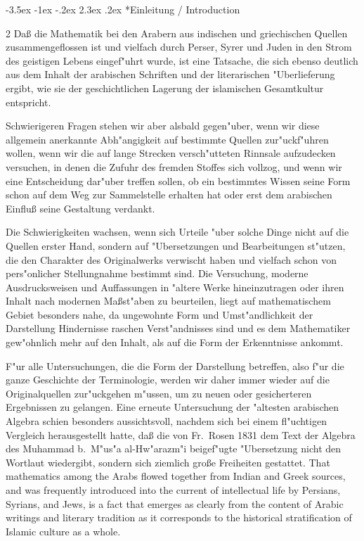 \documentclass[10pt,a4paper]{article}
\makeatletter
\renewcommand{\switchcolumn}{\syncronize\nointerlineskip\columnbreak}
\renewcommand{\section}{\@startsection{section}{1}{\z@}%
  {-3.5ex \@plus -1ex \@minus -.2ex}%
  {2.3ex \@plus .2ex}%
  {\normalfont\Large\bfseries\color{sectioncolor}}}
\makeatother
\begin{document}
\section*{Einleitung / Introduction}

\begin{paracol}{2}
Da\ss{} die Mathematik bei den Arabern aus indischen und griechischen Quellen zusammengeflossen ist und vielfach durch Perser, Syrer und Juden in den Strom des geistigen Lebens eingef"uhrt wurde, ist eine Tatsache, die sich ebenso deutlich aus dem Inhalt der arabischen Schriften und der literarischen "Uberlieferung ergibt, wie sie der geschichtlichen Lagerung der islamischen Gesamtkultur entspricht.

Schwierigeren Fragen stehen wir aber alsbald gegen"uber, wenn wir diese allgemein anerkannte Abh"angigkeit auf bestimmte Quellen zur"uckf"uhren wollen, wenn wir die auf lange Strecken versch"utteten Rinnsale aufzudecken versuchen, in denen die Zufuhr des fremden Stoffes sich vollzog, und wenn wir eine Entscheidung dar"uber treffen sollen, ob ein bestimmtes Wissen seine Form schon auf dem Weg zur Sammelstelle erhalten hat oder erst dem arabischen Einflu\ss{} seine Gestaltung verdankt.

Die Schwierigkeiten wachsen, wenn sich Urteile "uber solche Dinge nicht auf die Quellen erster Hand, sondern auf "Ubersetzungen und Bearbeitungen st"utzen, die den Charakter des Originalwerks verwischt haben und vielfach schon von pers"onlicher Stellungnahme bestimmt sind. Die Versuchung, moderne Ausdrucksweisen und Auffassungen in "altere Werke hineinzutragen oder ihren Inhalt nach modernen Ma\ss{}st"aben zu beurteilen, liegt auf mathematischem Gebiet besonders nahe, da ungewohnte Form und Umst"andlichkeit der Darstellung Hindernisse raschen Verst"andnisses sind und es dem Mathematiker gew"ohnlich mehr auf den Inhalt, als auf die Form der Erkenntnisse ankommt.

F"ur alle Untersuchungen, die die Form der Darstellung betreffen, also f"ur die ganze Geschichte der Terminologie, werden wir daher immer wieder auf die Originalquellen zur"uckgehen m"ussen, um zu neuen oder gesicherteren Ergebnissen zu gelangen. Eine erneute Untersuchung der "altesten arabischen Algebra schien besonders aussichtsvoll, nachdem sich bei einem fl"uchtigen Vergleich herausgestellt hatte, da\ss{} die von Fr.\ Rosen 1831 dem Text der Algebra des Muhammad b.\ M"us"a al-Hw"arazm"{i} beigef"ugte "Ubersetzung nicht den Wortlaut wiedergibt, sondern sich ziemlich gro\ss{}e Freiheiten gestattet.
\switchcolumn
That mathematics among the Arabs flowed together from Indian and Greek sources, and was frequently introduced into the current of intellectual life by Persians, Syrians, and Jews, is a fact that emerges as clearly from the content of Arabic writings and literary tradition as it corresponds to the historical stratification of Islamic culture as a whole.


\end{paracol}
\end{document}
